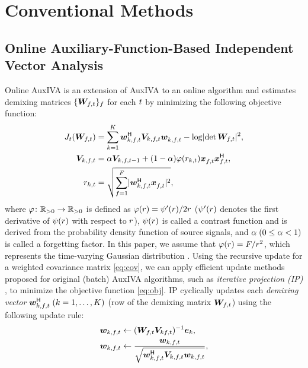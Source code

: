 \documentclass[sip,biber]{now-journal}
\begin{document}
\section{Conventional Methods}\label{sec:conventional}

\subsection{Online Auxiliary-Function-Based Independent Vector Analysis}\label{subsec:oiva}

Online AuxIVA \cite{Taniguchi:2014:HSCMA} is an extension of AuxIVA \cite{Ono:2011:WASPAA} to an online algorithm and estimates demixing matrices $\{\Demix _{\ft}\} _{\freq}$ for each $t$ by minimizing the following objective function:
\begin{align}
  J _{\tframe}(\Demix _{\ft}) &= \sum _{\src = 1} ^{\Src} \demix _{\src,\ft} ^{\hermite} \cov _{\src,\ft} \demix _{\src,\ft} ^{\nohermite} - \logdet{\Demix _{\ft}} ^2, \label{eq:obj} \\
  \cov _{\src,\ft} &= \forget \cov _{\src,\ft[-1]} + (1 - \forget) \weight(\var _{\src,\tframe}) \Obs _{\ft} ^{\nohermite} \Obs _{\ft} ^{\hermite}, \label{eq:cov} \\
  \var _{\src,\tframe} &= \sqrt{\sum _{\freq=1} ^{\Freq} \lvert \demix ^{\hermite} _{\src,\ft} \Obs ^{\nohermite}_{\ft} \rvert ^2} \label{eq:var},
\end{align}
where $\varphi\colon \mathbb{R} _{>0} \to \mathbb{R} _{>0}$ is defined as $\varphi(r) = \psi ' (r) / 2 r$ ($\psi '(r)$ denotes the first derivative of $\psi (r)$ with respect to $r$),
$\psi(r)$ is called a contrast function and is derived from the probability density function of source signals,
and $\alpha\; (0 \leq \alpha < 1)$ is called a forgetting factor.
In this paper, we assume that $\varphi (r) = F/{r ^2}$, which represents the time-varying Gaussian distribution \cite{Ono:2012:APSIPA}.
Using the recursive update for a weighted covariance matrix \eqref{eq:cov}, we can apply efficient update methods proposed for original (batch) AuxIVA algorithms, such as \emph{iterative projection (IP)} \cite{Ono:2011:WASPAA}, to minimize the objective function \eqref{eq:obj}.
IP cyclically updates each \emph{demixing vector} $\demix _{\src,\ft} ^{\hermite}\; (\src = 1, \dots, \Src)$ (row of the demixing matrix $\Demix _{\ft}$) using the following update rule:
\begin{align}
  \demix _{\src,\ft} &\gets (\Demix _{\ft} \cov _{\src\ft}) ^{-1} \eye _{\src} \label{eq:ip:proj}, \\
  \demix _{\src,\ft} &\gets \frac{{\demix _{\src,\ft}}}{{\sqrt{\demix _{\src,\ft} ^{\hermite} \cov _{\src,\ft} \demix _{\src,\ft}}}} \label{eq:ip:norm},
\end{align}
\end{document}
